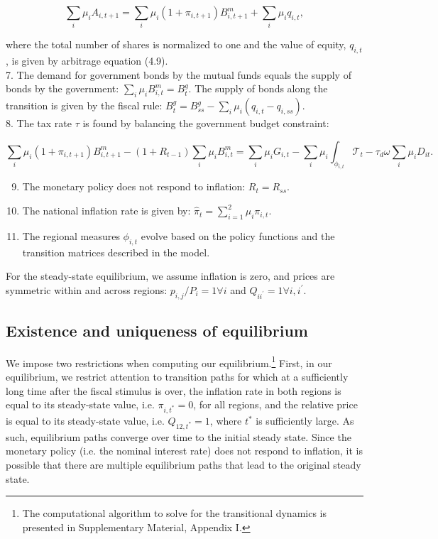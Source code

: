 \documentclass[\latexroot/\projectname]{subfiles}
\begin{document}
$$
\sum_{i} \mu_{i} A_{i, t+1}=\sum_{i} \mu_{i}\left(1+\pi_{i, t+1}\right) B_{i, t+1}^{m}+\sum_{i} \mu_{i} q_{i, t},
$$

where the total number of shares is normalized to one and the value of equity, $q_{i, t}$, is given by arbitrage equation (4.9).\\
7. The demand for government bonds by the mutual funds equals the supply of bonds by the government: $\sum_{i} \mu_{i} B_{i, t}^{m}=B_{t}^{g}$. The supply of bonds along the transition is given by the fiscal rule: $B_{t}^{g}=B_{s s}^{g}-\sum_{i} \mu_{i}\left(q_{i, t}-q_{i, s s}\right)$.\\
8. The tax rate $\tau$ is found by balancing the government budget constraint:

$$
\sum_{i} \mu_{i}\left(1+\pi_{i, t+1}\right) B_{i, t+1}^{m}-\left(1+R_{t-1}\right) \sum_{i} \mu_{i} B_{i, t}^{m}=\sum_{i} \mu_{i} G_{i, t}-\sum_{i} \mu_{i} \int_{\phi_{i, t}} \mathcal{T}_{t}-\tau_{d} \omega \sum_{i} \mu_{i} D_{i t} .
$$

\begin{enumerate}
  \setcounter{enumi}{8}
  \item The monetary policy does not respond to inflation: $R_{t}=R_{s s}$.
  \item The national inflation rate is given by: $\hat{\pi}_{t}=\sum_{i=1}^{2} \mu_{i} \pi_{i, t}$.
  \item The regional measures $\phi_{i, t}$ evolve based on the policy functions and the transition matrices described in the model.
\end{enumerate}

For the steady-state equilibrium, we assume inflation is zero, and prices are symmetric within and across regions: $p_{i, j} / P_{i}=1 \forall i$ and $Q_{i i^{\prime}}=1 \forall i, i^{\prime}$.

\subsection{Existence and uniqueness of equilibrium}
We impose two restrictions when computing our equilibrium.\footnote{The computational algorithm to solve for the transitional dynamics is presented in Supplementary Material, Appendix I.} First, in our equilibrium, we restrict attention to transition paths for which at a sufficiently long time after the fiscal stimulus is over, the inflation rate in both regions is equal to its steady-state value, i.e. $\pi_{i, t^{*}}=0$, for all regions, and the relative price is equal to its steady-state value, i.e. $Q_{12, t^{*}}=1$, where $t^{*}$ is sufficiently large. As such, equilibrium paths converge over time to the initial steady state. Since the monetary policy (i.e. the nominal interest rate) does not respond to inflation, it is possible that there are multiple equilibrium paths that lead to the original steady state.
\end{document}
